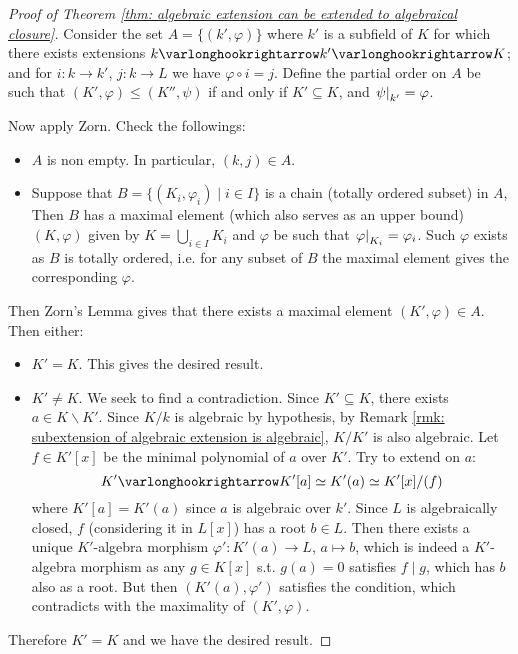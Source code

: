 \begin{proof}[Proof of Theorem \ref{thm: algebraic extension can be extended to algebraical closure}]
    Consider the set $A = \{ (k', \varphi) \}$ where $k'$ is a subfield of $K$ for which there exists extensions $k \ext k' \ext K$; and for $i: k \to k'$, $j: k \to L$ we have $\varphi \circ i = j$. Define the partial order on $A$ be such that $(K', \varphi) \leq (K'', \psi)$ if and only if $K' \subseteq K$, and $\left.\psi\right|_{k'} = \varphi$.

    Now apply Zorn. Check the followings:
    \begin{itemize}
        \item $A$ is non empty. In particular, $(k, j) \in A$.
        \item Suppose that $B = \{ (K_i, \varphi_i) \mid i \in I \}$ is a chain (totally ordered subset) in $A$, Then $B$ has a maximal element (which also serves as an upper bound) $(K, \varphi)$ given by $K = \bigcup_{i \in I} K_i$ and $\varphi$ be such that $\left.\varphi\right|_{K_i} = \varphi_i$. Such $\varphi$ exists as $B$ is totally ordered, i.e. for any subset of $B$ the maximal element gives the corresponding $\varphi$.
    \end{itemize}
    Then Zorn's Lemma gives that there exists a maximal element $(K', \varphi) \in A$. Then either:
    \begin{itemize}
        \item $K' = K$. This gives the desired result. 
        \item $K' \neq K$. We seek to find a contradiction. Since $K' \subseteq K$, there exists $a \in K \smallsetminus K'$. Since $K/k$ is algebraic by hypothesis, by Remark \ref{rmk: subextension of algebraic extension is algebraic}, $K/K'$ is also algebraic. Let $f \in K'[x]$ be the minimal polynomial of $a$ over $K'$. Try to extend on $a$: 
        \[
            K' \ext K'[a] \simeq K'(a) \simeq K'[x]/(f)
        \]
        where $K'[a] = K'(a)$ since $a$ is algebraic over $k'$. Since $L$ is algebraically closed, $f$ (considering it in $L[x]$) has a root $b \in L$. Then there exists a unique $K'$-algebra morphism $\varphi': K'(a) \to L$, $a \mapsto b$, which is indeed a $K'$-algebra morphism as any $g \in K[x]$ s.t. $g(a) = 0$ satisfies $f \mid g$, which has $b$ also as a root. But then $(K'(a), \varphi')$ satisfies the condition, which contradicts with the maximality of $(K', \varphi)$.
    \end{itemize}
    Therefore $K' = K$ and we have the desired result.
\end{proof}

